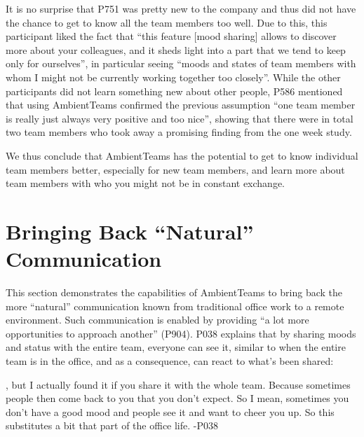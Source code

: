 It is no surprise that P751 was pretty new to the company and thus did not have the chance to get to know all the team members too well. Due to this, this participant liked the fact that \enquote{this feature [mood sharing] allows to discover more about your colleagues, and it sheds light into a part that we tend to keep only for ourselves}, in particular seeing \enquote{moods and states of team members with whom I might not be currently working together too closely}. While the other participants did not learn something new about other people, P586 mentioned that using AmbientTeams confirmed the previous assumption \enquote{one team member is really just always very positive and too nice}, showing that there were in total two team members who took away a promising finding from the one week study.

We thus conclude that AmbientTeams has the potential to get to know individual team members better, especially for new team members, and learn more about team members with who you might not be in constant exchange.


\section{Bringing Back \enquote{Natural} Communication}
This section demonstrates the capabilities of AmbientTeams to bring back the more \enquote{natural} communication known from traditional office work to a remote environment. Such communication is enabled by providing \enquote{a lot more opportunities to approach another} (P904). P038 explains that by sharing moods and status with the entire team, everyone can see it, similar to when the entire team is in the office, and as a consequence, can react to what's been shared:

\begin{displayquote}[][]
    [...], but I actually found it if you share it with the whole team. Because sometimes people then come back to you that you don't expect. So I mean, sometimes you don't have a good mood and people see it and want to cheer you up. So this substitutes a bit that part of the office life. -P038
\end{displayquote}

